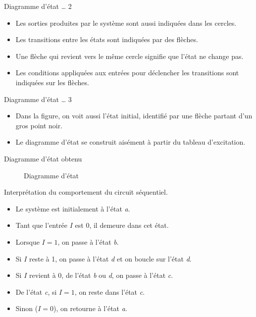 \documentclass[presentation]{beamer}
\begin{document}
\begin{frame}[label={sec:orgb4bc0e3}]{Diagramme d'état \ldots{} 2}
\begin{itemize}
\item Les sorties produites par le système sont aussi indiquées dans les cercles.

\item Les transitions entre les états sont indiquées par des flèches.

\item Une flèche qui revient vers le même cercle signifie que l'état ne change pas.

\item Les conditions appliquées aux entrées pour déclencher les transitions sont indiquées sur les flèches.
\end{itemize}
\end{frame}

\begin{frame}[label={sec:orgfdc2e8b}]{Diagramme d'état \ldots{} 3}
\begin{itemize}
\item Dans la figure, on voit aussi l'état initial, identifié par une flèche partant d'un gros point noir.

\item Le diagramme d'état se construit aisément à partir du tableau d'excitation.
\end{itemize}
\end{frame}

\begin{frame}[label={sec:org416573c}]{Diagramme d'état obtenu}
\begin{figure}[htbp]
\centering

\caption{\label{fig:org70e9402}Diagramme d'état}
\end{figure}
\end{frame}

\begin{frame}[label={sec:org7171914}]{Interprétation du comportement du circuit séquentiel.}
\begin{itemize}
\item Le système est initialement à l'état \emph{a}.

\item Tant que l'entrée \(I\) est 0, il demeure dans cet état.

\item Lorsque \(I=1\), on passe à l'état \emph{b}.

\item Si \(I\) reste à 1, on passe à l'état \emph{d} et on boucle sur l'état \emph{d}.

\item Si \(I\) revient à 0, de l'état \emph{b} ou \emph{d}, on passe à l'état \emph{c}.

\item De l'état \emph{c}, si \(I = 1\), on reste dans l'état \emph{c}.

\item Sinon (\(I = 0\)), on retourne à l'état \emph{a}.
\end{itemize}
\end{frame}
\end{document}
